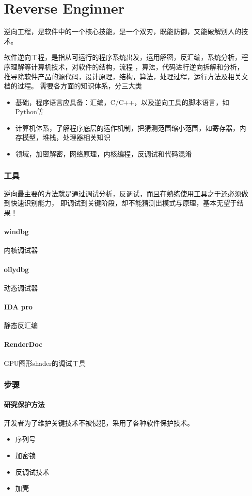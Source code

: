 \clearpage
\part{Reverse Enginner}
逆向工程，是软件中的一个核心技能，是一个双刃，既能防御，又能破解别人的技术。

软件逆向工程，是指从可运行的程序系统出发，运用解密，反汇编，系统分析，程序理解等计算机技术，对软件的结构，流程
，算法，代码进行逆向拆解和分析，推导除软件产品的源代码，设计原理，结构，算法，处理过程，运行方法及相关文档的过程。
需要各方面的知识体系，分三大类
\begin{itemize}
    \item {基础，程序语言应具备：汇编，C/C++，以及逆向工具的脚本语言，如Python等}
    \item {计算机体系，了解程序底层的运作机制，把猜测范围缩小范围，如寄存器，内存模型，堆栈，处理器相关知识}
    \item {领域，加密解密，网络原理，内核编程，反调试和代码混淆}
\end{itemize}

\section{工具}
逆向最主要的方法就是通过调试分析，反调试，而且在熟练使用工具之于还必须做到快速识别能力，
即调试到关键阶段，却不能猜测出模式与原理，基本无望于结果！

\subsection{windbg}
内核调试器

\subsection{ollydbg}
动态调试器

\subsection{IDA pro}
静态反汇编

\subsection{RenderDoc}
GPU图形shader的调试工具


\section{步骤}
\subsection{研究保护方法}
开发者为了维护关键技术不被侵犯，采用了各种软件保护技术。
\begin{itemize}
    \item {序列号}
    \item {加密锁}
    \item {反调试技术}
    \item {加壳}
\end{itemize}

